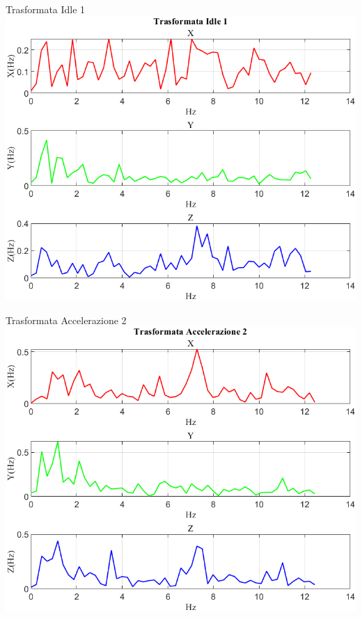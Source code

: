 \documentclass[beamer]{standalone}
\begin{document}
	\begin{frame}{{Trasformata Idle 1}}
		\centering\includegraphics[height=.8\textheight]{figure/Mag/Trasformata/Trasformata Idle 1}
	\end{frame}
	
	\begin{frame}{{Trasformata Accelerazione 2}}
		\centering\includegraphics[height=.8\textheight]{figure/Mag/Trasformata/Trasformata Accelerazione 2}
	\end{frame}
	
\end{document}
